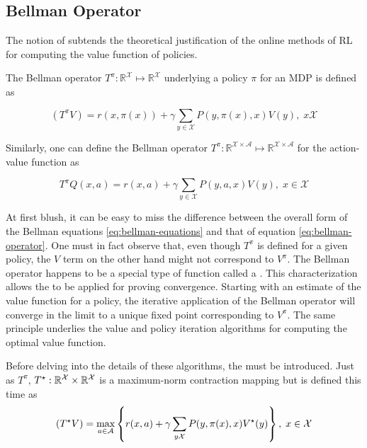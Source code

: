 \subsection{Bellman Operator}
The notion of  subtends the theoretical justification of the online methods of RL for computing the value function of policies. 

\begin{defn}
The Bellman operator $T^\pi: \mathbb{R}^\mathcal{X} \mapsto \mathbb{R}^\mathcal{X}$ underlying a policy $\pi$ for an MDP is defined as

\begin{equation}
(T^\pi V) = r(x, \pi(x)) + \gamma \sum_{y \in \mathcal{X}} P(y, \pi(x), x) V(y), \; x
\mathcal{X} \label{eq:bellman-operator}
\end{equation}
\end{defn}

Similarly, one can define the Bellman operator $T^\pi : \mathbb{R}^{\mathcal{X}
\times \mathcal{A}} \mapsto \mathbb{R}^{\mathcal{X} \times \mathcal{A}}$ for the
action-value function as

\begin{equation}
T^\pi Q(x, a) = r(x, a) + \gamma \sum_{y \in \mathcal{X}} P(y, a, x) V(y), \; x \in
\mathcal{X} \label{eq:bellman-operator-action-value}
\end{equation}

At first blush, it can be easy to miss the difference between the overall form of the
Bellman equations \ref{eq:bellman-equations} and that of equation \ref{eq:bellman-operator}. One must in fact observe that, even though $T^\pi$ is defined for a given
policy, the $V$ term on the other hand might not correspond to $V^\pi$. 
The Bellman operator happens to be a special type of function called a
. This characterization allows the  to be applied for proving convergence.  Starting with an
estimate of the value function for a policy, the iterative application of the Bellman
operator will converge in the limit to a unique fixed point corresponding to $V^\pi$. The same principle underlies the value and policy iteration algorithms for computing the optimal value function. 

Before delving into the details of these
algorithms, the  must be introduced. Just as
$T^\pi$, $T^\star: \mathbb{R}^\mathcal{X} \times \mathbb{R}^\mathcal{X}$ is a maximum-norm contraction mapping  but is defined this time as
\begin{equation}
(T^\star V) = \max_{a \in \mathcal{A}} \left\lbrace r(x, a) + \gamma \sum_{y
\mathcal{X}} P(y, \pi(x), x) V^\star (y) \right\rbrace, \; x \in \mathcal{X} 
\label{eq:bellman-optimality-operator}
\end{equation}

